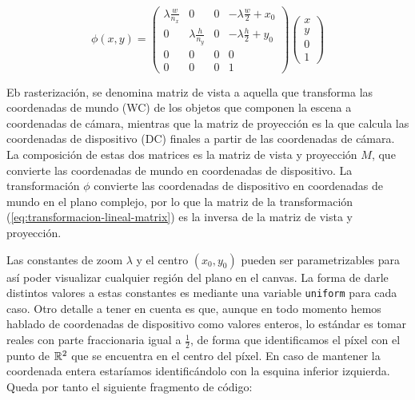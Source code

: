 \begin{equation}
    \label{eq:transformacion-lineal-matrix}
    \phi(x,y)=\left(\begin{array}{ccc|c}
        \lambda\frac{w}{n_x} & 0 & 0 & -\lambda\frac{w}{2}+x_0 \\

        0 & \lambda\frac{h}{n_y} & 0 & -\lambda\frac{h}{2}+y_0 \\
        0 & 0 & 0 & 0 \\ \hline
        0 & 0 & 0 & 1
    \end{array}\right)\left(
    \begin{array}{c}
        x \\ y \\ 0 \\ \hline 1
    \end{array}\right)
\end{equation}

Eb rasterización, se denomina matriz de vista a aquella que transforma las coordenadas de mundo (WC) de los objetos que componen la escena a coordenadas de cámara, mientras que la matriz de proyección es la que calcula las coordenadas de dispositivo (DC) finales a partir de las coordenadas de cámara. La composición de estas dos matrices es la matriz de vista y proyección $M$, que convierte las coordenadas de mundo en coordenadas de dispositivo. La transformación $\phi$ convierte las coordenadas de dispositivo en coordenadas de mundo en el plano complejo, por lo que la matriz de la transformación (\ref{eq:transformacion-lineal-matrix}) es la inversa de la matriz de vista y proyección.


Las constantes de zoom $\lambda$ y el centro $(x_0,y_0)$ pueden ser parametrizables para así poder visualizar cualquier región del plano en el canvas. La forma de darle distintos valores a estas constantes es mediante una variable \verb|uniform| para cada caso. Otro detalle a tener en cuenta es que, aunque en todo momento hemos hablado de coordenadas de dispositivo como valores enteros, lo estándar es tomar reales con parte fraccionaria igual a $\frac{1}{2}$, de forma que identificamos el píxel con el punto de $\mathbb{R}^2$ que se encuentra en el centro del píxel. En caso de mantener la coordenada entera estaríamos identificándolo con la esquina inferior izquierda. Queda por tanto el siguiente fragmento de código:

